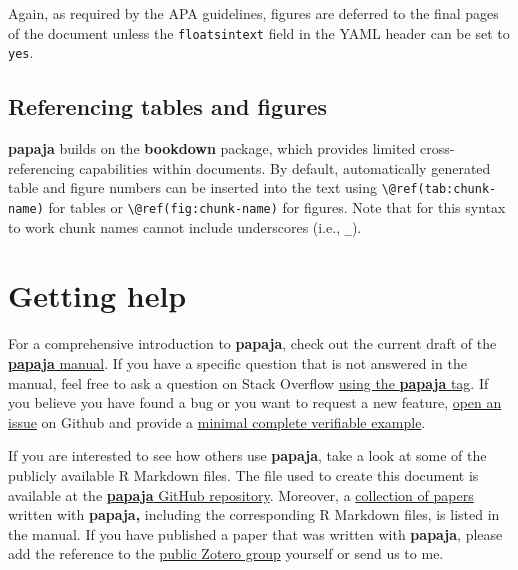 \documentclass[
  ,man,floatsintext]{apa6}
\begin{document}
Again, as required by the APA guidelines, figures are deferred to the final pages of the document unless the \texttt{floatsintext} field in the YAML header can be set to \texttt{yes}.

\hypertarget{referencing-tables-and-figures}{%
\subsection{Referencing tables and figures}\label{referencing-tables-and-figures}}

\textbf{papaja} builds on the \textbf{bookdown} package, which provides limited cross-referencing capabilities within documents.
By default, automatically generated table and figure numbers can be inserted into the text using \texttt{\textbackslash{}@ref(tab:chunk-name)} for tables or \texttt{\textbackslash{}@ref(fig:chunk-name)} for figures.
Note that for this syntax to work chunk names cannot include underscores (i.e., \texttt{\_}).

\hypertarget{getting-help}{%
\section{Getting help}\label{getting-help}}

For a comprehensive introduction to \textbf{papaja}, check out the current draft of the \href{http://frederikaust.com/papaja_man/}{\textbf{papaja} manual}.
If you have a specific question that is not answered in the manual, feel free to ask a question on Stack Overflow \href{https://stackoverflow.com/questions/tagged/papaja}{using the \textbf{papaja} tag}.
If you believe you have found a bug or you want to request a new feature, \href{https://github.com/crsh/papaja/issues}{open an issue} on Github and provide a \href{https://stackoverflow.com/help/mcve}{minimal complete verifiable example}.

If you are interested to see how others use \textbf{papaja}, take a look at some of the publicly available R Markdown files.
The file used to create this document is available at the \href{https://github.com/crsh/papaja/blob/master/vignettes/papaja.Rmd}{\textbf{papaja} GitHub repository}.
Moreover, a \href{http://frederikaust.com/papaja_man/published-manuscripts.html}{collection of papers} written with \textbf{papaja,} including the corresponding R Markdown files, is listed in the manual.
If you have published a paper that was written with \textbf{papaja}, please add the reference to the \href{https://www.zotero.org/groups/2202906/papaja}{public Zotero group} yourself or send us to me.
\end{document}
